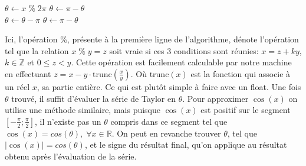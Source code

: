 \documentclass{article}
\begin{document}
\begin{algorithm}
\begin{algorithmic}[1]
\State $\theta \gets x\;\%\;2\pi$
    \State $\theta \gets \pi-\theta$
\EndIf
\\
        \State $\theta \gets \theta-\pi$
        \State $\theta \gets \pi-\theta$
    \EndIf
\EndIf
\end{algorithmic}
\end{algorithm}

Ici, l'opération \%, présente à la première ligne de l'algorithme, dénote l'opération tel que la relation $x\;\%\;y = z$ soit vraie si ces 3 conditions sont réunies: $x = z +ky$, $k \in \mathbb{Z}$ et $0\le z<y$. Cette opération est facilement calculable par notre machine en effectuant $z = x-y\cdot\text{trunc}(\frac{x}{y})$. Où $\text{trunc}(x)$ est la fonction qui associe à un réel $x$, sa partie entière. Ce qui est plutôt simple à faire avec un float.
Une fois $\theta$ trouvé, il suffit d'évaluer la série de Taylor en $\theta$.
Pour approximer $\cos(x)$ on utilise une méthode similaire, mais puisque $\cos(x)$ est positif sur le segment $[-\frac{\pi}{2}; \frac{\pi}{2}]$, il n'existe pas un $\theta$ compris dans ce segment tel que $\cos(x) = cos(\theta),\;\forall x \in \mathbb{R}.$ On peut en revanche trouver $\theta$, tel que $|\cos(x)| = cos(\theta)$, et le signe du résultat final, qu'on applique au résultat obtenu après l'évaluation de la série.
\end{document}
